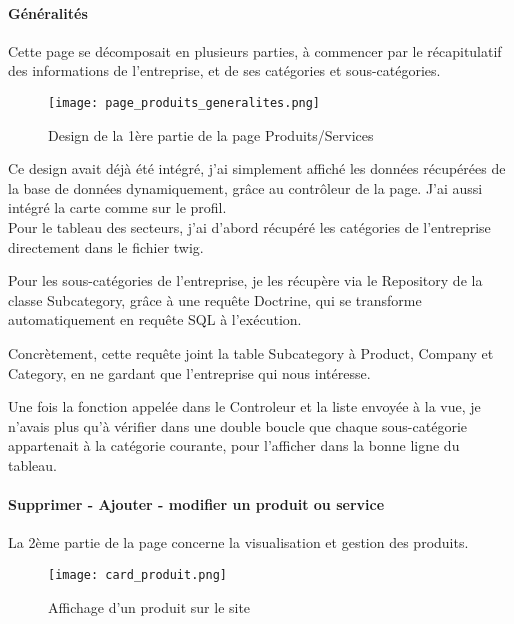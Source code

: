\paragraph*{Généralités}
\label{generalites}


Cette page se décomposait en plusieurs parties, à commencer par le récapitulatif des informations de l'entreprise, et de ses catégories et sous-catégories.

\begin{figure}[H]
    \texttt{[image: page\_produits\_generalites.png]}
    \caption{Design de la 1ère partie de la page Produits/Services}
\end{figure}

Ce design avait déjà été intégré, j'ai simplement affiché les données récupérées de la base de données dynamiquement, grâce au contrôleur de la page.
J'ai aussi intégré la carte comme sur le profil.\\

Pour le tableau des secteurs, j'ai d'abord récupéré les catégories de l'entreprise directement dans le fichier twig.

Pour les sous-catégories de l'entreprise, je les récupère via le Repository de la classe Subcategory, grâce à une requête Doctrine, qui se transforme automatiquement en requête SQL à l'exécution.

Concrètement, cette requête joint la table Subcategory à Product, Company et Category, en ne gardant que l'entreprise qui nous intéresse.

Une fois la fonction appelée dans le Controleur et la liste envoyée à la vue, je n'avais plus qu'à vérifier dans une double boucle que chaque sous-catégorie appartenait à la catégorie courante, pour l'afficher dans la bonne ligne du tableau.



\paragraph{Supprimer - Ajouter - modifier un produit ou service}

La 2ème partie de la page concerne la visualisation et gestion des produits.

\begin{figure}[H]
    \texttt{[image: card\_produit.png]}
    \caption{Affichage d'un produit sur le site}
\end{figure}

